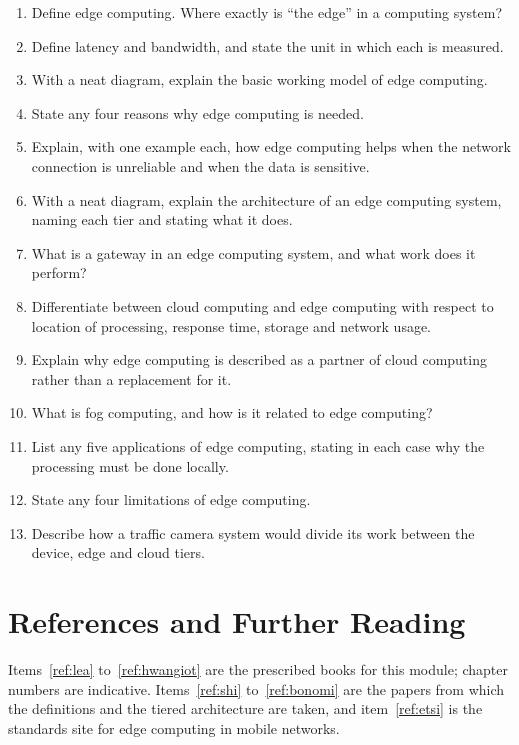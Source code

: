 \documentclass[../main.tex]{subfiles}
\begin{document}
\begin{enumerate}[label=\arabic*.]
  \item Define edge computing. Where exactly is ``the edge'' in a computing
        system?
  \item Define latency and bandwidth, and state the unit in which each is
        measured.
  \item With a neat diagram, explain the basic working model of edge
        computing.
  \item State any four reasons why edge computing is needed.
  \item Explain, with one example each, how edge computing helps when the
        network connection is unreliable and when the data is sensitive.
  \item With a neat diagram, explain the architecture of an edge computing
        system, naming each tier and stating what it does.
  \item What is a gateway in an edge computing system, and what work does it
        perform?
  \item Differentiate between cloud computing and edge computing with respect
        to location of processing, response time, storage and network usage.
  \item Explain why edge computing is described as a partner of cloud
        computing rather than a replacement for it.
  \item What is fog computing, and how is it related to edge computing?
  \item List any five applications of edge computing, stating in each case
        why the processing must be done locally.
  \item State any four limitations of edge computing.
  \item Describe how a traffic camera system would divide its work between
        the device, edge and cloud tiers.
\end{enumerate}

\section{References and Further Reading}

Items~\ref{ref:lea} to~\ref{ref:hwangiot} are the prescribed books for this
module; chapter numbers are indicative. Items~\ref{ref:shi}
to~\ref{ref:bonomi} are the papers from which the definitions and the tiered
architecture are taken, and item~\ref{ref:etsi} is the standards site for
edge computing in mobile networks.
\end{document}

